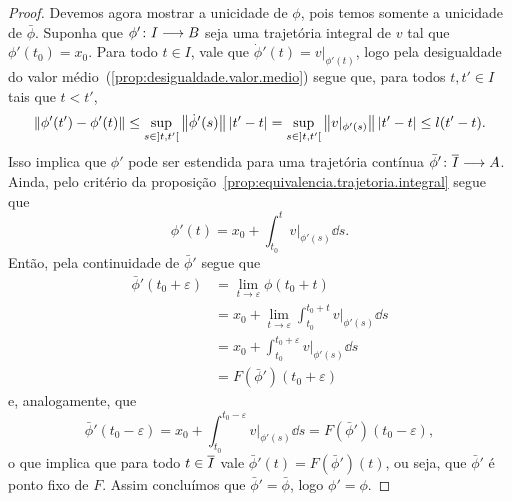 \begin{proof}
Devemos agora mostrar a unicidade de $\phi$, pois temos somente a unicidade de $\bar\phi$. Suponha que $\phi'\colon \allowbreak I \longrightarrow B$ seja uma trajetória integral de $v$ tal que $\phi'(t_0) = x_0$. Para todo $t \in I$, vale que $\dot \phi'(t) = v|_{\phi'(t)}$, logo pela desigualdade do valor médio~(\ref{prop:desigualdade.valor.medio}) segue que, para todos $t, t' \in I$ tais que $t < t'$,
	\begin{equation*}
	\left\Vert{\phi'(t') - \phi'(t)}\right\Vert \leq \sup_{s \in \left]t,\allowbreak t'\right[} \left\Vert{\dot\phi'(s)}\right\Vert\left\vert{t'-t}\right\vert = \sup_{s \in \left]t,\allowbreak t'\right[} \left\Vert{v|_{\phi'(s)}}\right\Vert\left\vert{t'-t}\right\vert \leq l(t'-t).
	\end{equation*}
Isso implica que $\phi'$ pode ser estendida para uma trajetória contínua $\bar\phi'\colon \allowbreak \overline{I} \longrightarrow A$. %
Ainda, pelo critério da proposição~\ref{prop:equivalencia.trajetoria.integral} segue que
	\begin{equation*}
	\phi'(t) = x_0 + \int_{t_0}^{t} v|_{\phi'(s)} \dd s.
	\end{equation*}
Então, pela continuidade de $\bar\phi'$ segue que
	\begin{align*}
	\bar\phi'(t_0+\varepsilon) &= \lim_{t \to \varepsilon} \phi(t_0+t) \\
		&= x_0 + \lim_{t \to \varepsilon} \int_{t_0}^{t_0+t} v|_{\phi'(s)} \dd s \\
		&= x_0 + \int_{t_0}^{t_0+\varepsilon} v|_{\phi'(s)} \dd s \\
		&= F(\bar\phi')(t_0+\varepsilon)
	\end{align*}
e, analogamente, que
	\begin{equation*}
	\bar\phi'(t_0-\varepsilon) = %
	x_0 + \int_{t_0}^{t_0-\varepsilon} v|_{\phi'(s)} \dd s = F(\bar\phi')(t_0-\varepsilon),
	\end{equation*}
o que implica que para todo $t \in \overline{I}$ vale $\bar\phi'(t) = F(\bar\phi')(t)$, ou seja, que $\bar\phi'$ é ponto fixo de $F$. Assim concluímos que $\bar\phi' = \bar\phi$, logo $\phi' = \phi$.
\end{proof}



